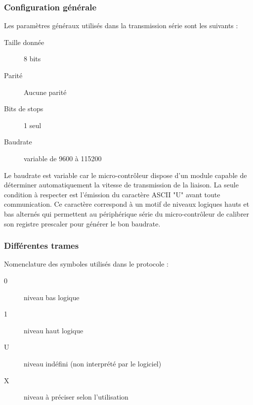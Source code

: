 \documentclass[11pt, french]{article} %
\begin{document}
\subsubsection{Configuration générale}
\noindent
Les paramètres généraux utilisés dans la transmission série sont les suivants :
\begin{description}
	\item[Taille donnée] 8 bits
	\item[Parité] Aucune parité
	\item[Bits de stops] 1 seul
	\item[Baudrate] variable de 9600 à 115200
\end{description}

\medskip
Le baudrate est variable car le micro-contrôleur dispose d'un module capable de déterminer automatiquement la vitesse de transmission de la liaison. La seule condition à respecter est l'émission du caractère ASCII "U" avant toute communication. Ce caractère correspond à un motif de niveaux logiques hauts et bas alternés qui permettent au périphérique série du micro-contrôleur de calibrer son registre prescaler pour générer le bon baudrate.

\subsubsection{Différentes trames}
\noindent
Nomenclature des symboles utilisés dans le protocole :

\medskip
\begin{description}
	\item[0] niveau bas logique
	\item[1] niveau haut logique
	\item[U] niveau indéfini (non interprété par le logiciel)
	\item[X] niveau à préciser selon l'utilisation
\end{description}
\end{document}
